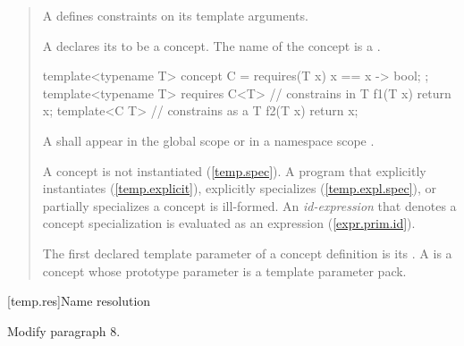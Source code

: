 \begin{quote}
\begin{addedblock}
\pnum A  defines constraints on its template arguments.


\pnum A  declares its 
to be a concept. The name of the concept is a .
\enterexample
\begin{codeblock}
template<typename T>
concept C = requires(T x) {
  { x == x } -> bool;
};
template<typename T> 
  requires C<T> //  constrains  in 
T f1(T x) { return x; }
template<C T> //  constrains  as a 
T f2(T x) { return x; }
\end{codeblock}
\exitexample

\pnum
A  shall appear in the global scope or in a
namespace scope .

\pnum
A concept is not instantiated (\ref{temp.spec}). 
A program that explicitly instantiates (\ref{temp.explicit}), explicitly 
specializes (\ref{temp.expl.spec}), or partially
specializes a concept is ill-formed. 
\enternote
An \emph{id-expression} that denotes a concept specialization is evaluated as
an expression (\ref{expr.prim.id}).
\exitnote

\pnum
The first declared template parameter of a concept definition is its 
.
A  is a concept whose prototype parameter is a template 
parameter pack.
\end{addedblock}
\end{quote}

[temp.res]{Name resolution}

Modify paragraph 8.


